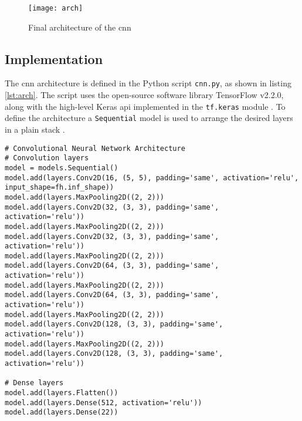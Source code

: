 \begin{figure}
  \centering
  \texttt{[image: arch]}
  \caption{Final architecture of the \acrlong{cnn}}
  \label{fig:arch}
\end{figure}

\subsection{Implementation}
\label{subsec:training_of_the_cnn:architecture:implementation}
The \acrshort{cnn} architecture is defined in the Python script \texttt{cnn.py}, as shown in listing \ref{lst:arch}.
The script uses the open-source software library TensorFlow v2.2.0, along with the high-level Keras \acrshort{api} implemented in the \texttt{tf.keras} module \cite{training_arch_tf_keras}.
To define the architecture a \texttt{Sequential} model is used to arrange the desired layers in a plain stack \cite{training_arch_tf_keras_seq}.

\begin{lstlisting}[style=python, caption={Sequential model}, label=lst:arch]
# Convolutional Neural Network Architecture
# Convolution layers
model = models.Sequential()
model.add(layers.Conv2D(16, (5, 5), padding='same', activation='relu', input_shape=fh.inf_shape))
model.add(layers.MaxPooling2D((2, 2)))
model.add(layers.Conv2D(32, (3, 3), padding='same', activation='relu'))
model.add(layers.MaxPooling2D((2, 2)))
model.add(layers.Conv2D(32, (3, 3), padding='same', activation='relu'))
model.add(layers.MaxPooling2D((2, 2)))
model.add(layers.Conv2D(64, (3, 3), padding='same', activation='relu'))
model.add(layers.MaxPooling2D((2, 2)))
model.add(layers.Conv2D(64, (3, 3), padding='same', activation='relu'))
model.add(layers.MaxPooling2D((2, 2)))
model.add(layers.Conv2D(128, (3, 3), padding='same', activation='relu'))
model.add(layers.MaxPooling2D((2, 2)))
model.add(layers.Conv2D(128, (3, 3), padding='same', activation='relu'))

# Dense layers
model.add(layers.Flatten())
model.add(layers.Dense(512, activation='relu'))
model.add(layers.Dense(22))
\end{lstlisting}
